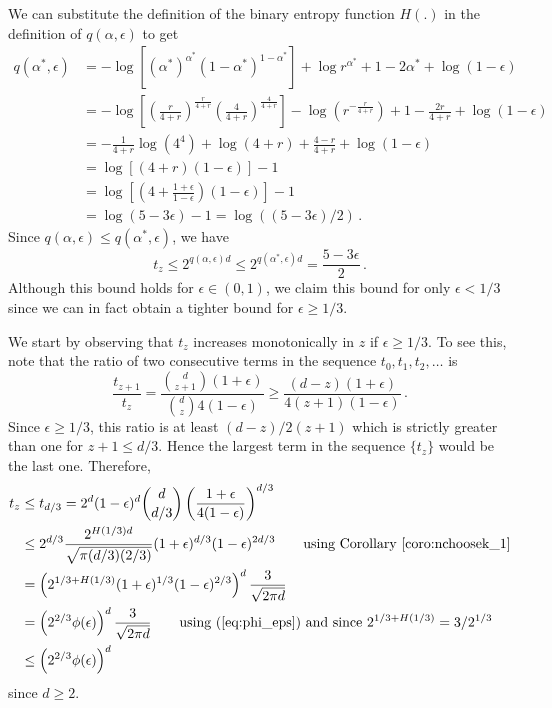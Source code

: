   We can substitute the definition of the binary entropy function $H(.)$ 
  in the definition of $q(\alpha, \epsilon)$ to get 
  \begin{align*}
  q(\alpha^*, \epsilon) 
  &= -\log\left[
  \left(\alpha^*\right)^{\alpha^*}(1-{\alpha^*})^{1-{\alpha^*}}
  \right] 
  + \log r^{\alpha^*} + 1 - 2{\alpha^*} + \log(1-\epsilon) \\
  &= -\log\left[ \left(\frac{r}{4+r}\right)^{\frac{r}{4+r}} \left(\frac{4}{4+r}\right)^{\frac{4}{4+r}}\right] 
   - \log \left(r^{-\frac{r}{4+r}} \right) + 1 - \frac{2r}{4+r}+\log(1-\epsilon) \\
  &= -\frac{1}{4+r} \log(4^4) + \log(4+r)+\frac{4-r}{4+r} + \log(1-\epsilon) \\
  &= \log\left[(4+r)(1-\epsilon)\right] - 1 \\
  &= \log\left[\left(4+\frac{1+\epsilon}{1-\epsilon}\right)(1-\epsilon)\right] - 1 \\
  &= \log(5-3\epsilon) - 1  = \log\left( (5 - 3 \epsilon)/2 \right)
  \,.
  \end{align*} 
  Since $q(\alpha, \epsilon) \leq q(\alpha^*, \epsilon)$, we have 
  \[
      t_z \leq 2^{q(\alpha, \epsilon)d} \leq 2^{q(\alpha^*, \epsilon)d} = \frac{5 - 3 \epsilon}{2}
      \,.
  \]
  Although this bound holds for $\epsilon \in (0, 1)$, we claim this bound for only $\epsilon < 1/3$ 
  since we can in fact obtain a tighter bound for $\epsilon \geq 1/3$. 


  We start by observing that $t_z$ increases monotonically in $z$ if $\epsilon \geq 1/3$. 
  To see this, note that the ratio of two consecutive terms in the sequence $t_0, t_1, t_2, \ldots$ is
  \[
  \frac{t_{z+1}}{t_z} 
  =\frac{ {d \choose z+1} (1+\epsilon) }{ {d \choose z} 4(1-\epsilon) } 
  \geq \frac{(d-z)(1+\epsilon)}{4(z+1) (1-\epsilon)}\, .
  \]
  Since $\epsilon \geq 1/3$, this ratio is at least $(d-z)/2(z+1)$ which is 
  strictly greater than one for $z+1 \leq d/3$. 
  Hence the largest term in the sequence $\{t_z\}$ would be the last one. 
  Therefore,
  \begin{align*}
  t_z
  &\leq t_{d/3} = 2^d (1-\epsilon)^d 
  {d \choose d/3} 
  \left(\frac{1+\epsilon}{4(1-\epsilon)}\right)^{d/3} \\
  &\leq 2^{d/3}
  \frac{2^{H(1/3)d}}{\sqrt{ \pi (d/3) (2/3)}} 
  (1+\epsilon)^{d/3}(1-\epsilon)^{2d/3}  \qquad \text{using Corollary~\ref{coro:nchoosek_1}} \\
  &= \left( 2^{1/3 + H(1/3)} (1+\epsilon)^{1/3} (1-\epsilon)^{2/3} \right)^d \frac{3}{\sqrt{2 \pi d}} \\
  &= \left( 2^{2/3} \phi(\epsilon) \right)^d \frac{3}{\sqrt{2 \pi d}} 
  \qquad \text{using (\ref{eq:phi_eps}) and since }2^{1/3 + H(1/3)} = 3/2^{1/3}\\
  &\leq \left( 2^{2/3} \phi(\epsilon) \right)^d
  \end{align*}
  since $d \geq 2$. 

